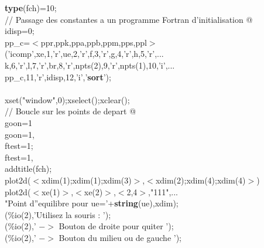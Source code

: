 {\begin{flushleft}
{ {\bf type}(fch)=10;\\ 
\cmarg \verb@// Passage des constantes a un programme Fortran d'initialisation @\\ 
\cmarg \hspace{0.5cm}idisp=0;\\ 
\cmarg \hspace{0.5cm}pp\_c=$<$ppr,ppk,ppa,ppb,ppm,pps,ppl$>$\\ 
\cmarg \hspace{0.5cm}{\bf fort}('icomp',xe,1,'r',ue,2,'r',f,3,'r',g,4,'r',h,5,'r',...\\ 
\cmarg \hspace{1.5cm}k,6,'r',l,7,'r',br,8,'r',npts(2),9,'r',npts(1),10,'i',...\\ 
\cmarg \hspace{1.5cm}pp\_c,11,'r',idisp,12,'i','{\bf sort}');\\ 
 \\ 
\cmarg xset("window",0);xselect();xclear();\\ 
\cmarg \verb@// Boucle sur les points de depart @\\ 
\cmarg \hspace{0.5cm}goon=1\\ 
\cmarg \hspace{0.5cm}{\bf while} goon=1,\\ 
\cmarg \hspace{1.8cm}ftest=1;\\ 
\cmarg \hspace{1.8cm}{\bf while} ftest=1,\\ 
\cmarg \hspace{2.5cm}addtitle(fch);\\ 
\cmarg \hspace{2.5cm}plot2d($<$xdim(1);xdim(1);xdim(3)$>$,$<$xdim(2);xdim(4);xdim(4)$>$)\\ 
\cmarg \hspace{2.5cm}plot2d($<$xe(1)$>$,$<$xe(2)$>$,$<$2,4$>$,"111",...\\ 
\cmarg \hspace{3.5cm}"Point d''equilibre pour ue='+{\bf string}(ue),xdim);\\ 
\cmarg \hspace{2.5cm}{\bf write}(\%io(2),'Utilisez la souris : ');\\ 
\cmarg \hspace{2.5cm}{\bf write}(\%io(2),' $-$$>$ Bouton de droite pour quiter ');\\ 
\cmarg \hspace{2.5cm}{\bf write}(\%io(2),' $-$$>$ Bouton du milieu ou de gauche ');\\ 
}
\end{flushleft}}
